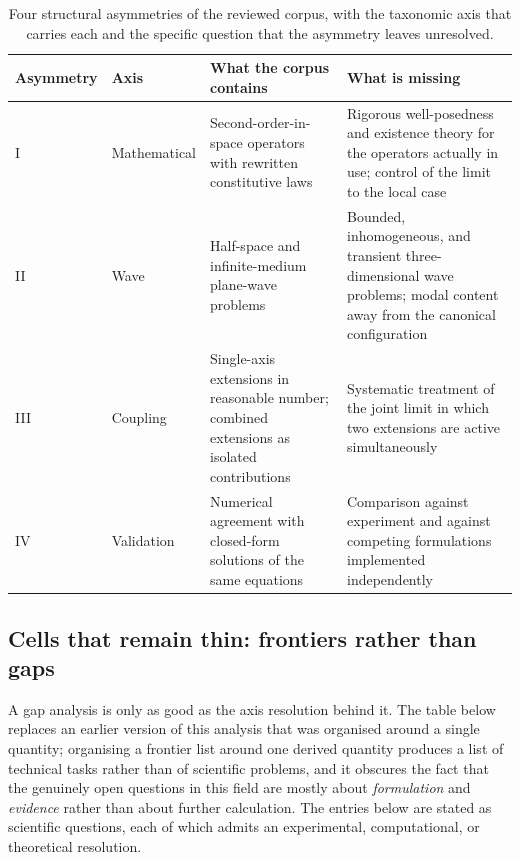 \begin{table}[htbp]
\centering
\small
\caption{Four structural asymmetries of the reviewed corpus, with the taxonomic axis that carries each and the specific question that the asymmetry leaves unresolved.}
\label{tab:asymmetries}
\begin{tabularx}{\textwidth}{@{}p{1.4cm}p{2.0cm}X X@{}}
\toprule
\textbf{Asym\-metry} & \textbf{Axis} & \textbf{What the corpus contains} & \textbf{What is missing} \\
\midrule
I & Mathe\-matical & Second-order-in-space operators with rewritten constitutive laws & Rigorous well-posedness and existence theory for the operators actually in use; control of the limit to the local case \\
II & Wave & Half-space and infinite-medium plane-wave problems & Bounded, inhomogeneous, and transient three-dimensional wave problems; modal content away from the canonical configuration \\
III & Coupling & Single-axis extensions in reasonable number; combined extensions as isolated contributions & Systematic treatment of the joint limit in which two extensions are active simultaneously \\
IV & Validation & Numerical agreement with closed-form solutions of the same equations & Comparison against experiment and against competing formulations implemented independently \\
\bottomrule
\end{tabularx}
\end{table}


\subsection{Cells that remain thin: frontiers rather than gaps}
\label{sec:14.5}

A gap analysis is only as good as the axis resolution behind it. The table below replaces an earlier version of this analysis that was organised around a single quantity; organising a frontier list around one derived quantity produces a list of technical tasks rather than of scientific problems, and it obscures the fact that the genuinely open questions in this field are mostly about \emph{formulation} and \emph{evidence} rather than about further calculation. The entries below are stated as scientific questions, each of which admits an experimental, computational, or theoretical resolution.

